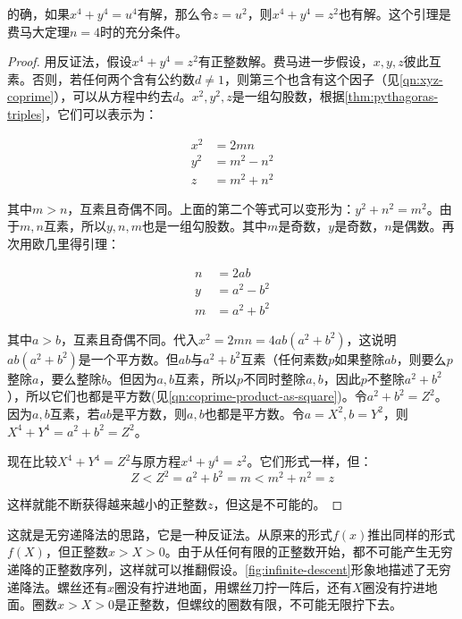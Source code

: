 \documentclass[b5paper]{ctexart}
\begin{document}
的确，如果$x^4 + y^4 = u^4$有解，那么令$z = u^2$，则$x^4 + y^4 = z^2$也有解。这个引理是费马大定理$n = 4$时的充分条件。

\begin{proof}
用反证法，假设$x^4 + y^4 = z^2$有正整数解。费马进一步假设，$x, y, z$彼此互素。否则，若任何两个含有公约数$d \ne 1$，则第三个也含有这个因子（见\cref{qn:xyz-coprime}），可以从方程中约去$d$。$x^2, y^2, z$是一组勾股数，根据\cref{thm:pythagoras-triples}，它们可以表示为：

\begin{align*}
x^2 &= 2mn \\
y^2 &= m^2 - n^2 \\
z &= m^2 + n^2
\end{align*}

其中$m > n$，互素且奇偶不同。上面的第二个等式可以变形为：$y^2 + n^2 = m^2$。由于$m, n$互素，所以$y, n, m$也是一组勾股数。其中$m$是奇数，$y$是奇数，$n$是偶数。再次用欧几里得引理：

\begin{align*}
n &= 2ab \\
y &= a^2 - b^2 \\
m &= a^2 + b^2
\end{align*}

其中$a > b$，互素且奇偶不同。代入$x^2 = 2mn = 4ab(a^2 + b^2)$，这说明$ab(a^2 + b^2)$是一个平方数。但$ab$与$a^2 + b^2$互素（任何素数$p$如果整除$ab$，则要么$p$整除$a$，要么整除$b$。但因为$a, b$互素，所以$p$不同时整除$a, b$，因此$p$不整除$a^2 + b^2$），所以它们也都是平方数(见\cref{qn:coprime-product-as-square})。令$a^2 + b^2 = Z^2$。因为$a, b$互素，若$ab$是平方数，则$a, b$也都是平方数。令$a = X^2, b= Y^2$，则$X^4 + Y^4 = a^2 + b^2 = Z^2$。

现在比较$X^4 + Y^4 = Z^2$与原方程$x^4 + y^4 = z^2$。它们形式一样，但：
\[
Z < Z^2 = a^2 + b^2 = m < m^2 + n^2 = z
\]

这样就能不断获得越来越小的正整数$z$，但这是不可能的。
\end{proof}

这就是无穷递降法的思路，它是一种反证法。从原来的形式$f(x)$推出同样的形式$f(X)$，但正整数$x > X > 0$。由于从任何有限的正整数开始，都不可能产生无穷递降的正整数序列，这样就可以推翻假设。\cref{fig:infinite-descent}形象地描述了无穷递降法。螺丝还有$x$圈没有拧进地面，用螺丝刀拧一阵后，还有$X$圈没有拧进地面。圈数$x > X > 0$是正整数，但螺纹的圈数有限，不可能无限拧下去。
\end{document}
